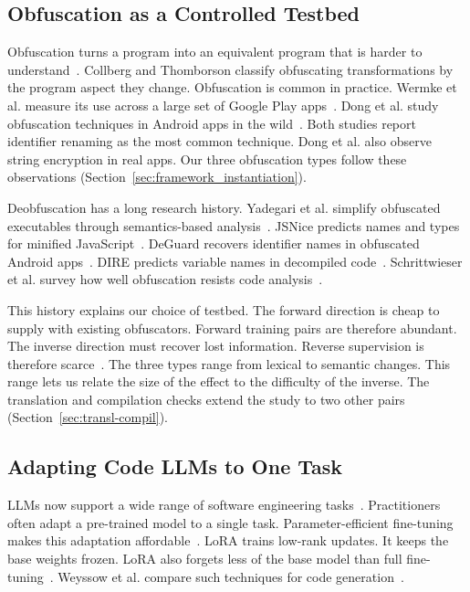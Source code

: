 \subsection{Obfuscation as a Controlled Testbed}
\label{sec:bg-obfuscation}
 
Obfuscation turns a program into an equivalent program that is harder to understand~\cite{collberg2002watermarking}.
Collberg and Thomborson classify obfuscating transformations by the program aspect they change.
Obfuscation is common in practice.
Wermke et al. measure its use across a large set of Google Play apps~\cite{wermke2018obfuscation}.
Dong et al. study obfuscation techniques in Android apps in the wild~\cite{dong2018android}.
Both studies report identifier renaming as the most common technique.
Dong et al. also observe string encryption in real apps.
Our three obfuscation types follow these observations (Section~\ref{sec:framework_instantiation}).
 
Deobfuscation has a long research history.
Yadegari et al. simplify obfuscated executables through semantics-based analysis~\cite{yadegari2015generic}.
JSNice predicts names and types for minified JavaScript~\cite{raychev2015jsnice}.
DeGuard recovers identifier names in obfuscated Android apps~\cite{bichsel2016deguard}.
DIRE predicts variable names in decompiled code~\cite{lacomis2019dire}.
Schrittwieser et al. survey how well obfuscation resists code analysis~\cite{schrittwieser2016protecting}.
 
This history explains our choice of testbed.
The forward direction is cheap to supply with existing obfuscators.
Forward training pairs are therefore abundant.
The inverse direction must recover lost information.
Reverse supervision is therefore scarce~\cite{10.1145/3728886}.
The three types range from lexical to semantic changes.
This range lets us relate the size of the effect to the difficulty of the inverse.
The translation and compilation checks extend the study to two other pairs (Section~\ref{sec:transl-compil}).
 
\subsection{Adapting Code LLMs to One Task}
\label{sec:bg-adaptation}
 
LLMs now support a wide range of software engineering tasks~\cite{hou2024llm4se}.
Practitioners often adapt a pre-trained model to a single task.
Parameter-efficient fine-tuning makes this adaptation affordable~\cite{hu2022lora}.
LoRA trains low-rank updates.
It keeps the base weights frozen. 
LoRA also forgets less of the base model than full fine-tuning~\cite{biderman2024lora}.
Weyssow et al. compare such techniques for code generation~\cite{weyssow2025peft}.
 
